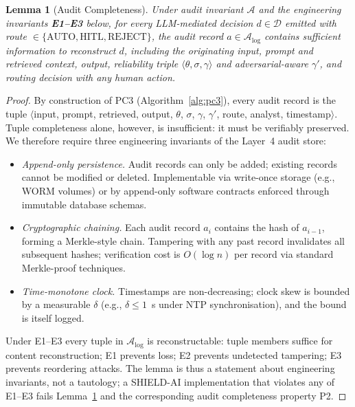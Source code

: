 \documentclass[preprint,12pt,authoryear]{elsarticle}
\newtheorem{lemma}{Lemma}
\begin{document}
\begin{lemma}[Audit Completeness]
\label{lem:audit}
Under audit invariant $\mathcal{A}$ and the engineering invariants \textbf{E1--E3} below, for every LLM-mediated decision $d \in \mathcal{D}$ emitted with route $\in \{\text{AUTO}, \text{HITL}, \text{REJECT}\}$, the audit record $a \in \mathcal{A}_{\text{log}}$ contains sufficient information to reconstruct $d$, including the originating input, prompt and retrieved context, output, reliability triple $\langle\theta, \sigma, \gamma\rangle$ \emph{and} adversarial-aware $\gamma'$, and routing decision with any human action.
\end{lemma}
\begin{proof}
By construction of PC3 (Algorithm~\ref{alg:pc3}), every audit record is the tuple $\langle$input, prompt, retrieved, output, $\theta$, $\sigma$, $\gamma$, $\gamma'$, route, analyst, timestamp$\rangle$. Tuple completeness alone, however, is insufficient: it must be verifiably preserved. We therefore require three engineering invariants of the Layer~4 audit store:
\begin{itemize}
  \item[\textbf{E1}] \emph{Append-only persistence.} Audit records can only be added; existing records cannot be modified or deleted. Implementable via write-once storage (e.g., WORM volumes) or by append-only software contracts enforced through immutable database schemas.
  \item[\textbf{E2}] \emph{Cryptographic chaining.} Each audit record $a_i$ contains the hash of $a_{i-1}$, forming a Merkle-style chain. Tampering with any past record invalidates all subsequent hashes; verification cost is $O(\log n)$ per record via standard Merkle-proof techniques.
  \item[\textbf{E3}] \emph{Time-monotone clock.} Timestamps are non-decreasing; clock skew is bounded by a measurable $\delta$ (e.g., $\delta \leq 1$~s under NTP synchronisation), and the bound is itself logged.
\end{itemize}
Under E1--E3 every tuple in $\mathcal{A}_{\text{log}}$ is reconstructable: tuple members suffice for content reconstruction; E1 prevents loss; E2 prevents undetected tampering; E3 prevents reordering attacks. The lemma is thus a statement about engineering invariants, not a tautology; a SHIELD-AI implementation that violates any of E1--E3 fails Lemma~\ref{lem:audit} and the corresponding audit completeness property P2.
\end{proof}
\end{document}
